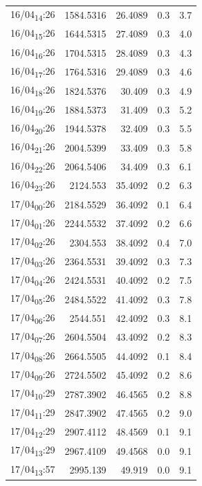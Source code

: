 \documentclass[11pt]{article}
\begin{document}
\begin{center}
\begin{tabular}{lrrrr}
16/04\textsubscript{14}:26 & 1584.5316 & 26.4089 & 0.3 & 3.7\\[0pt]
16/04\textsubscript{15}:26 & 1644.5315 & 27.4089 & 0.3 & 4.0\\[0pt]
16/04\textsubscript{16}:26 & 1704.5315 & 28.4089 & 0.3 & 4.3\\[0pt]
16/04\textsubscript{17}:26 & 1764.5316 & 29.4089 & 0.3 & 4.6\\[0pt]
16/04\textsubscript{18}:26 & 1824.5376 & 30.409 & 0.3 & 4.9\\[0pt]
16/04\textsubscript{19}:26 & 1884.5373 & 31.409 & 0.3 & 5.2\\[0pt]
16/04\textsubscript{20}:26 & 1944.5378 & 32.409 & 0.3 & 5.5\\[0pt]
16/04\textsubscript{21}:26 & 2004.5399 & 33.409 & 0.3 & 5.8\\[0pt]
16/04\textsubscript{22}:26 & 2064.5406 & 34.409 & 0.3 & 6.1\\[0pt]
16/04\textsubscript{23}:26 & 2124.553 & 35.4092 & 0.2 & 6.3\\[0pt]
17/04\textsubscript{00}:26 & 2184.5529 & 36.4092 & 0.1 & 6.4\\[0pt]
17/04\textsubscript{01}:26 & 2244.5532 & 37.4092 & 0.2 & 6.6\\[0pt]
17/04\textsubscript{02}:26 & 2304.553 & 38.4092 & 0.4 & 7.0\\[0pt]
17/04\textsubscript{03}:26 & 2364.5531 & 39.4092 & 0.3 & 7.3\\[0pt]
17/04\textsubscript{04}:26 & 2424.5531 & 40.4092 & 0.2 & 7.5\\[0pt]
17/04\textsubscript{05}:26 & 2484.5522 & 41.4092 & 0.3 & 7.8\\[0pt]
17/04\textsubscript{06}:26 & 2544.551 & 42.4092 & 0.3 & 8.1\\[0pt]
17/04\textsubscript{07}:26 & 2604.5504 & 43.4092 & 0.2 & 8.3\\[0pt]
17/04\textsubscript{08}:26 & 2664.5505 & 44.4092 & 0.1 & 8.4\\[0pt]
17/04\textsubscript{09}:26 & 2724.5502 & 45.4092 & 0.2 & 8.6\\[0pt]
17/04\textsubscript{10}:29 & 2787.3902 & 46.4565 & 0.2 & 8.8\\[0pt]
17/04\textsubscript{11}:29 & 2847.3902 & 47.4565 & 0.2 & 9.0\\[0pt]
17/04\textsubscript{12}:29 & 2907.4112 & 48.4569 & 0.1 & 9.1\\[0pt]
17/04\textsubscript{13}:29 & 2967.4109 & 49.4568 & 0.0 & 9.1\\[0pt]
17/04\textsubscript{13}:57 & 2995.139 & 49.919 & 0.0 & 9.1\\[0pt]

\end{tabular}
\end{center}
\end{document}
